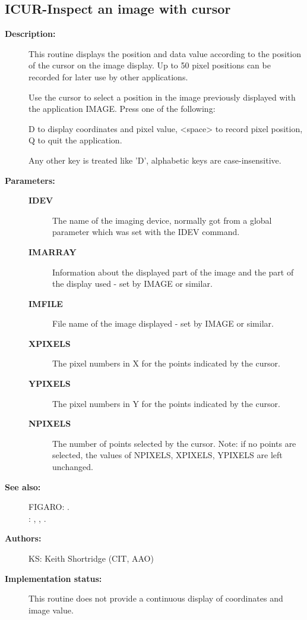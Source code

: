 \subsection{ICUR-\label{ICUR}Inspect an image with cursor}
\begin{description}

\item [{\bf Description:}]
 This routine displays the position and data value according to the
 position of the cursor on the image display. Up to 50 pixel
 positions can be recorded for later use by other applications.

 Use the cursor to select a position in the image previously
 displayed with the application IMAGE. Press one of the following:

      D     to display coordinates and pixel value,
   <space>  to record pixel position,
      Q     to quit the application.

 Any other key is treated like 'D', alphabetic keys are
 case-insensitive.

\item [{\bf Parameters:}]
\begin{description}
\item [{\bf IDEV}]
 The name of the imaging device, normally got from a global
 parameter which was set with the IDEV command.
\item [{\bf IMARRAY}]
 Information about the displayed part of the image and the part
 of the display used - set by IMAGE or similar.
\item [{\bf IMFILE}]
 File name of the image displayed - set by IMAGE or similar.
\item [{\bf XPIXELS}]
 The pixel numbers in X for the points indicated by the cursor.
\item [{\bf YPIXELS}]
 The pixel numbers in Y for the points indicated by the cursor.
\item [{\bf NPIXELS}]
 The number of points selected by the cursor. Note: if no points
 are selected, the values of NPIXELS, XPIXELS, YPIXELS are left
 unchanged.
\end{description}

\item [{\bf See also:}]
FIGARO: .\\
: , , .\\

\item [{\bf Authors:}]
 KS: Keith Shortridge (CIT, AAO)

\item [{\bf Implementation status:}]
 This routine does not provide a continuous display of coordinates
 and image value.
\end{description}
